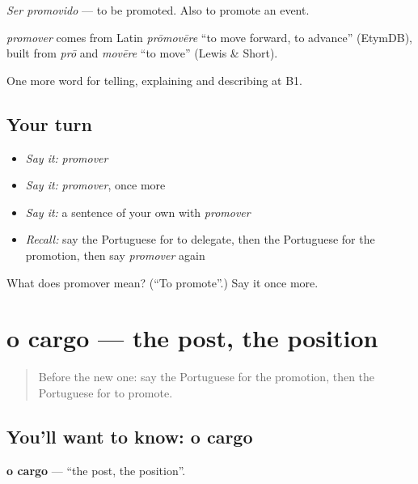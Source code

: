 \emph{Ser promovido} — to be promoted. Also to promote an event.

\begin{cousinweb}
\emph{promover} comes from Latin \emph{prōmovēre} \textquotedblleft{}to move forward, to advance\textquotedblright{} (EtymDB), built from \emph{prō} and \emph{movēre} \textquotedblleft{}to move\textquotedblright{} (Lewis \& Short).
\end{cousinweb}

\begin{grammarlens}[title={What you've built}]
One more word for telling, explaining and describing at B1.
\end{grammarlens}

\subsection*{Your turn}
\begin{itemize}
\raggedright
  \item \emph{Say it:} \emph{promover}
  \item \emph{Say it:} \emph{promover}, once more
  \item \emph{Say it:} a sentence of your own with \emph{promover}
  \item \emph{Recall:} say the Portuguese for to delegate, then the Portuguese for the promotion, then say \emph{promover} again
\end{itemize}

\begin{tcolorbox}[breakable,colback=teal!4,colframe=teal!35!black,title={Before you move on}]
What does promover mean? (\textquotedblleft{}To promote\textquotedblright{}.) Say it once more.
\end{tcolorbox}
\section[o cargo]{o cargo — the post, the position}

\label{lesson:PT-C360-cargo}



\begin{quote}
Before the new one: say the Portuguese for the promotion, then the Portuguese for to promote.
\end{quote}

\subsection*{You'll want to know: o cargo}
\textbf{o cargo} — \textquotedblleft{}the post, the position\textquotedblright{}.

